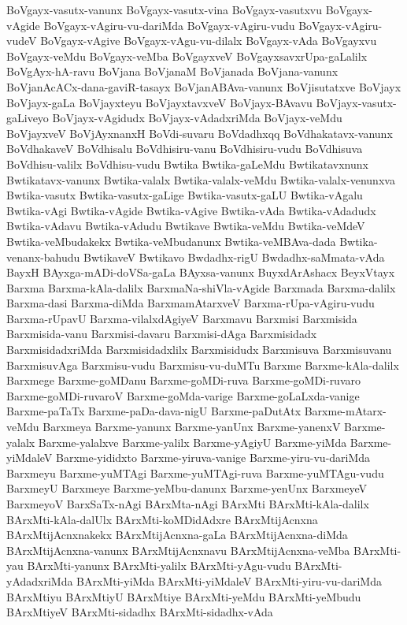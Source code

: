 {BoVgayx-vasutx-vanunx
BoVgayx-vasutx-vina
BoVgayx-vasutxvu
BoVgayx-vAgide
BoVgayx-vAgiru-vu-dariMda
BoVgayx-vAgiru-vudu
BoVgayx-vAgiru-vudeV
BoVgayx-vAgive
BoVgayx-vAgu-vu-dilalx
BoVgayx-vAda
BoVgayxvu
BoVgayx-veMdu
BoVgayx-veMba
BoVgayxveV
BoVgayxsavxrUpa-gaLalilx
BoVgAyx-hA-ravu
BoVjana
BoVjanaM
BoVjanada
BoVjana-vanunx
BoVjanAcACx-dana-gaviR-tasayx
BoVjanABAva-vanunx
BoVjisutatxve
BoVjayx
BoVjayx-gaLa
BoVjayxteyu
BoVjayxtavxveV
BoVjayx-BAvavu
BoVjayx-vasutx-gaLiveyo
BoVjayx-vAgidudx
BoVjayx-vAdadxriMda
BoVjayx-veMdu
BoVjayxveV
BoVjAyxnanxH
BoVdi-suvaru
BoVdadhxqq
BoVdhakatavx-vanunx
BoVdhakaveV
BoVdhisalu
BoVdhisiru-vanu
BoVdhisiru-vudu
BoVdhisuva
BoVdhisu-valilx
BoVdhisu-vudu
Bwtika
Bwtika-gaLeMdu
Bwtikatavxnunx
Bwtikatavx-vanunx
Bwtika-valalx
Bwtika-valalx-veMdu
Bwtika-valalx-venunxva
Bwtika-vasutx
Bwtika-vasutx-gaLige
Bwtika-vasutx-gaLU
Bwtika-vAgalu
Bwtika-vAgi
Bwtika-vAgide
Bwtika-vAgive
Bwtika-vAda
Bwtika-vAdadudx
Bwtika-vAdavu
Bwtika-vAdudu
Bwtikave
Bwtika-veMdu
Bwtika-veMdeV
Bwtika-veMbudakekx
Bwtika-veMbudanunx
Bwtika-veMBAva-dada
Bwtika-venanx-bahudu
BwtikaveV
Bwtikavo
Bwdadhx-rigU
Bwdadhx-saMmata-vAda
BayxH
BAyxga-mADi-doVSa-gaLa
BAyxsa-vanunx
BuyxdArAshacx
BeyxVtayx
Barxma
Barxma-kAla-dalilx
BarxmaNa-shiVla-vAgide
Barxmada
Barxma-dalilx
Barxma-dasi
Barxma-diMda
BarxmamAtarxveV
Barxma-rUpa-vAgiru-vudu
Barxma-rUpavU
Barxma-vilalxdAgiyeV
Barxmavu
Barxmisi
Barxmisida
Barxmisida-vanu
Barxmisi-davaru
Barxmisi-dAga
Barxmisidadx
BarxmisidadxriMda
Barxmisidadxlilx
Barxmisidudx
Barxmisuva
Barxmisuvanu
BarxmisuvAga
Barxmisu-vudu
Barxmisu-vu-duMTu
Barxme
Barxme-kAla-dalilx
Barxmege
Barxme-goMDanu
Barxme-goMDi-ruva
Barxme-goMDi-ruvaro
Barxme-goMDi-ruvaroV
Barxme-goMda-varige
Barxme-goLaLxda-vanige
Barxme-paTaTx
Barxme-paDa-dava-nigU
Barxme-paDutAtx
Barxme-mAtarx-veMdu
Barxmeya
Barxme-yanunx
Barxme-yanUnx
Barxme-yanenxV
Barxme-yalalx
Barxme-yalalxve
Barxme-yalilx
Barxme-yAgiyU
Barxme-yiMda
Barxme-yiMdaleV
Barxme-yididxto
Barxme-yiruva-vanige
Barxme-yiru-vu-dariMda
Barxmeyu
Barxme-yuMTAgi
Barxme-yuMTAgi-ruva
Barxme-yuMTAgu-vudu
BarxmeyU
Barxmeye
Barxme-yeMbu-danunx
Barxme-yenUnx
BarxmeyeV
BarxmeyoV
BarxSaTx-nAgi
BArxMta-nAgi
BArxMti
BArxMti-kAla-dalilx
BArxMti-kAla-dalUlx
BArxMti-koMDidAdxre
BArxMtijAcnxna
BArxMtijAcnxnakekx
BArxMtijAcnxna-gaLa
BArxMtijAcnxna-diMda
BArxMtijAcnxna-vanunx
BArxMtijAcnxnavu
BArxMtijAcnxna-veMba
BArxMti-yau
BArxMti-yanunx
BArxMti-yalilx
BArxMti-yAgu-vudu
BArxMti-yAdadxriMda
BArxMti-yiMda
BArxMti-yiMdaleV
BArxMti-yiru-vu-dariMda
BArxMtiyu
BArxMtiyU
BArxMtiye
BArxMti-yeMdu
BArxMti-yeMbudu
BArxMtiyeV
BArxMti-sidadhx
BArxMti-sidadhx-vAda
}
